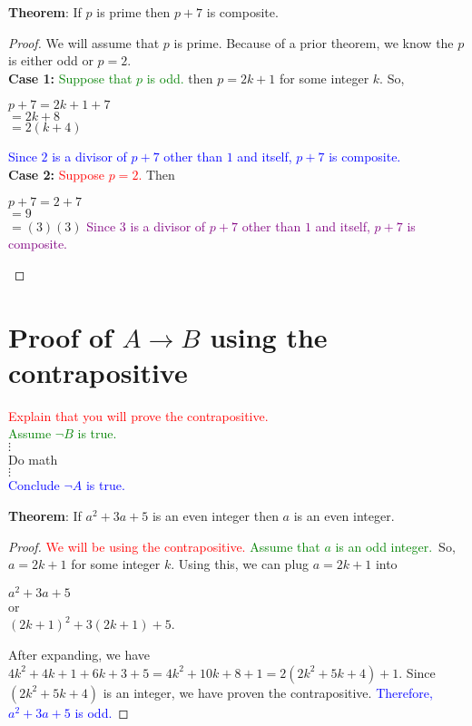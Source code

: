 \documentclass[11pt, oneside]{article}
\begin{document}
\noindent \textbf{Theorem}:   If $p$ is prime then $p+7$ is composite.
\begin{proof}
We will assume that $p$ is prime. Because of a prior theorem, we know the $p$ is either odd or $p=2$.\\
\textbf{Case 1:}  
\textcolor{green}{Suppose that $p$ is odd.} then $p=2k+1$ for some integer $k$. So,
\begin{center}
$p+7=2k+1+7$\\
$=2k+8$\\
$=2(k+4)$    
\end{center}
\textcolor{blue}{Since $2$ is a divisor of $p+7$ other than $1$ and itself, $p+7$ is composite.}\\
\textbf{Case 2:}
\textcolor{red}{Suppose $p=2$.} Then
\begin{center}
$p+7=2+7$\\
$=9$\\
$=(3)(3)$
\textcolor{purple}{Since $3$ is a divisor of $p+7$ other than $1$ and itself, $p+7$ is composite.}
\end{center}


\end{proof}



		\newpage


\section{Proof of $A \rightarrow B$ using the contrapositive }

		\begin{center}
		\textcolor{red}{Explain that you will prove the contrapositive.}\\
		\textcolor{green}{ Assume $\neg B$ is true.}\\
		 $\vdots$ \\ Do math \\ $\vdots$ \\
		 \textcolor{blue}{Conclude $\neg A$ is true.}\\[0.2in]
		 \end{center}
		 
 \noindent \textbf{Theorem}:   If $a^{2}+3a+5$ is an even integer then $a$ is an even integer.
 \begin{proof}\textcolor{red}{We will be using the contrapositive.}
		\textcolor{green}{ Assume that $a$ is an odd integer.}\
		  So, $a=2k+1$ for some integer $k$. Using this, we can plug $a=2k+1$ into
		 \begin{center}$a^{2}+3a+5$\\
		 or\\
		     $(2k+1)^{2}+3(2k+1)+5$.
		 \end{center}  
		 After expanding, we have $4k^{2}+4k+1+6k+3+5=4k^{2}+10k+8+1=2(2k^{2}+5k+4)+1$. Since $(2k^{2}+5k+4)$ is an integer, we have proven the contrapositive.
		 \textcolor{blue}{Therefore, $a^{2}+3a+5$ is odd.}\end{proof}
		 
\end{document}

